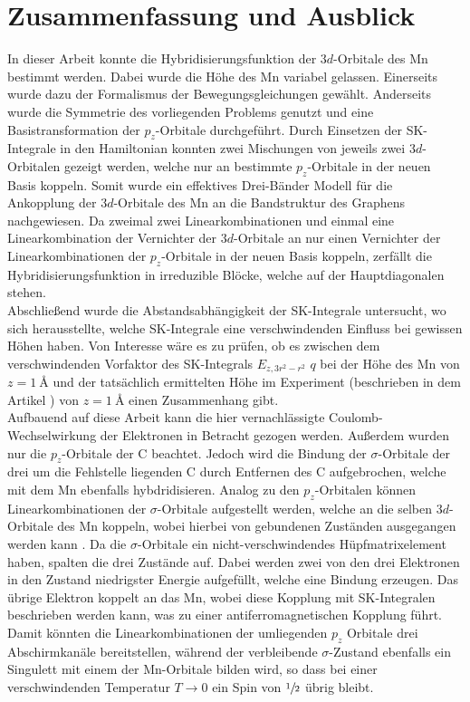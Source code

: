 \chapter{Zusammenfassung und Ausblick}
\label{chap:Zusammenfassung_und_Ausblick}
In dieser Arbeit konnte die Hybridisierungsfunktion der $3d$-Orbitale des Mn bestimmt werden.
Dabei wurde die Höhe des Mn variabel gelassen.
Einerseits wurde dazu der Formalismus der Bewegungsgleichungen gewählt.
Anderseits wurde die Symmetrie des vorliegenden Problems genutzt und eine Basistransformation der $p_z$-Orbitale durchgeführt. 
Durch Einsetzen der SK-Integrale in den Hamiltonian konnten zwei Mischungen von jeweils zwei $3d$-Orbitalen gezeigt werden, welche nur 
an bestimmte $p_z$-Orbitale in der neuen Basis koppeln.
Somit wurde ein effektives Drei-Bänder Modell für die Ankopplung der $3d$-Orbitale des Mn an die Bandstruktur des Graphens nachgewiesen.
Da zweimal zwei Linearkombinationen und einmal eine Linearkombination der Vernichter der $3d$-Orbitale an nur einen Vernichter der Linearkombinationen
der $p_z$-Orbitale in der neuen Basis koppeln, zerfällt die Hybridisierungsfunktion in irreduzible Blöcke, welche auf der Hauptdiagonalen stehen. \\
Abschließend wurde die Abstandsabhängigkeit der SK-Integrale untersucht, wo sich herausstellte, welche SK-Integrale 
eine verschwindenden Einfluss bei gewissen Höhen haben.
Von Interesse wäre es zu prüfen, ob es zwischen dem verschwindenden Vorfaktor des SK-Integrals $E_{z,3r^2-r^2}$ $q$ bei der Höhe 
des Mn von $z=\qty{1}{\angstrom}$ und der tatsächlich ermittelten Höhe im Experiment (beschrieben in dem 
Artikel \cite{doi:10.1021/acsnano.1c00139}) von $z=\qty{1}{\angstrom}$ einen Zusammenhang gibt.\\
Aufbauend auf diese Arbeit kann die hier vernachlässigte Coulomb-Wechselwirkung der Elektronen in Betracht gezogen werden.
Außerdem wurden nur die $p_z$-Orbitale der C beachtet.
Jedoch wird die Bindung der $\sigma$-Orbitale der drei um die Fehlstelle liegenden C durch Entfernen des C
aufgebrochen, welche mit dem Mn ebenfalls hybdridisieren.
Analog zu den $p_z$-Orbitalen können Linearkombinationen der $\sigma$-Orbitale aufgestellt werden, welche an die selben 
$3d$-Orbitale des Mn koppeln, wobei hierbei von gebundenen Zuständen ausgegangen werden kann \cite{PhysRevB.97.155419}.
Da die $\sigma$-Orbitale ein nicht-verschwindendes Hüpfmatrixelement haben, spalten die drei Zustände auf.
Dabei werden zwei von den drei Elektronen in den Zustand niedrigster Energie aufgefüllt, welche eine Bindung erzeugen. 
Das übrige Elektron koppelt an das Mn, wobei diese Kopplung mit SK-Integralen beschrieben werden kann, was 
zu einer antiferromagnetischen Kopplung führt.
Damit könnten die Linearkombinationen der umliegenden $p_z$ Orbitale drei Abschirmkanäle bereitstellen, während der verbleibende $\sigma$-Zustand
ebenfalls ein Singulett mit einem der Mn-Orbitale bilden wird, so dass bei einer verschwindenden Temperatur $T \to 0$ ein Spin von 
$\sfrac{1}{2}$ übrig bleibt.